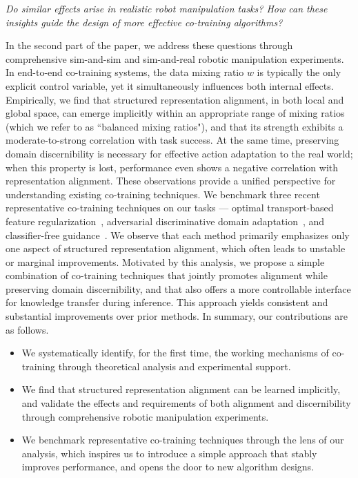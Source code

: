 \textit{
Do similar effects arise in realistic robot manipulation tasks?
How can these insights guide the design of more effective co-training algorithms?
}




In the second part of the paper, we address these questions through comprehensive sim-and-sim and sim-and-real robotic manipulation experiments.
In end-to-end co-training systems, the data mixing ratio $w$ is typically the only explicit control variable, yet it simultaneously influences both internal effects.
Empirically, we find that structured representation alignment, in both local and global space, can emerge implicitly within an appropriate range of mixing ratios (which we refer to as ``balanced mixing ratios"), and that its strength exhibits a moderate-to-strong correlation with task success.
At the same time, preserving domain discernibility is necessary for effective action adaptation to the real world; when this property is lost, performance even shows a negative correlation with representation alignment.
These observations provide a unified perspective for understanding existing co-training techniques. We benchmark three recent representative co-training techniques on our tasks --- optimal transport-based feature regularization~\cite{cheng2025generalizable, punamiya2025egobridge}, adversarial discriminative domain adaptation~\cite{cai2025n, yuan2025motiontrans}, and classifier-free guidance~\cite{wei2025empirical}. 
We observe that each method primarily emphasizes only one aspect of structured representation alignment, which often leads to unstable or marginal improvements.
Motivated by this analysis, we propose a simple combination of co-training techniques that jointly promotes alignment while preserving domain discernibility, and that also offers a more controllable interface for knowledge transfer during inference. This approach yields consistent and substantial improvements over prior methods.
 In summary, our contributions are as follows.
\begin{itemize}[leftmargin=*]
    \item We systematically identify, for the first time, the working mechanisms of co-training through theoretical analysis and experimental support.
    \item We find that structured representation alignment can be learned implicitly, and validate the effects and requirements of both alignment and discernibility through comprehensive robotic manipulation experiments.
    \item We benchmark representative co-training techniques through the lens of our analysis, which inspires us to introduce a simple approach that stably improves performance, and opens the door to new algorithm designs.
\end{itemize}







